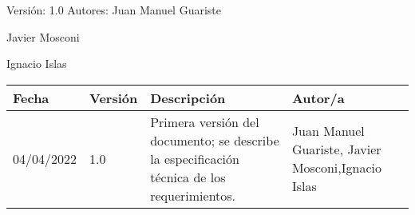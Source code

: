 \documentclass{article} %
\begin{document}
\noindent 

\noindent Versi\'{o}n: 1.0      Autores: Juan Manuel Guariste 

         Javier Mosconi

         Ignacio Islas

\begin{tabular}{|p{1.1in}|p{1.1in}|p{1.1in}|p{1.3in}|} \hline 
Fecha & Versi\'{o}n & Descripci\'{o}n & Autor/a \\ \hline 
04/04/2022 & 1.0 & Primera versi\'{o}n del documento; se describe la especificaci\'{o}n t\'{e}cnica de los requerimientos. & Juan Manuel Guariste, Javier Mosconi,\newline Ignacio Islas \\ \hline 
\end{tabular}

\textbf{}

\noindent \eject 

\noindent 
\end{document}
